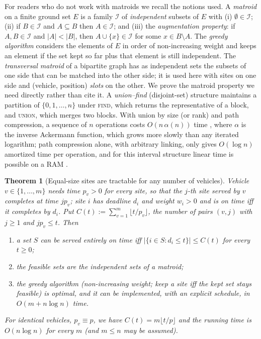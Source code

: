 \documentclass[pdflatex,sn-mathphys-ay]{sn-jnl}
\theoremstyle{thmstyleone}
\newtheorem{theorem}{Theorem}
\theoremstyle{thmstyletwo}
\theoremstyle{thmstylethree}
\begin{document}
For readers who do not work with matroids we recall the notions used.
A \emph{matroid} on a finite ground set $E$ is a family $\mathcal I$ of
\emph{independent} subsets of $E$ with (i) $\emptyset\in\mathcal I$;
(ii) if $B\in\mathcal I$ and $A\subseteq B$ then $A\in\mathcal I$; and
(iii) the \emph{augmentation property}: if $A,B\in\mathcal I$ and
$|A|<|B|$, then $A\cup\{x\}\in\mathcal I$ for some $x\in B\setminus A$.
The \emph{greedy algorithm} considers the elements of $E$ in order of
non-increasing weight and keeps an element if the set kept so far plus
that element is still independent. The \emph{transversal matroid} of a
bipartite graph has as independent sets the subsets of one side that can
be matched into the other side; it is used here with sites on one side
and (vehicle, position) \emph{slots} on the other. We prove the matroid
property we need directly rather than cite it. A \emph{union--find}
(disjoint-set) structure maintains a partition of $\{0,1,\dots,n\}$ under
\textsc{find}, which returns the representative of a block, and
\textsc{union}, which merges two blocks. With union by size (or rank) and
path compression, a sequence of $n$ operations costs $O(n\,\alpha(n))$
time \citep{kortevygen2018}, where $\alpha$ is the inverse Ackermann
function, which grows more slowly than any iterated logarithm; path
compression alone, with arbitrary linking, only gives $O(\log n)$
amortized time per operation, and for this interval structure linear time
is possible on a RAM \citep{gabow1985}.

\begin{theorem}[Equal-size sites are tractable for any number of vehicles]\label{thm:equalp}
Vehicle $v\in\{1,\dots,m\}$ needs time $p_v>0$ for every site, so that
the $j$-th site served by $v$ completes at time $jp_v$; site $i$ has
deadline $d_i$ and weight $w_i>0$ and is on time iff it completes by
$d_i$. Put $C(t):=\sum_{v=1}^m\lfloor t/p_v\rfloor$, the number of pairs
$(v,j)$ with $j\ge1$ and $jp_v\le t$. Then
\begin{enumerate}
\item[(a)] a set $S$ can be served entirely on time iff
$|\{i\in S:d_i\le t\}|\le C(t)$ for every $t\ge0$;
\item[(b)] the feasible sets are the independent sets of a matroid;
\item[(c)] the greedy algorithm (non-increasing weight; keep a site iff
the kept set stays feasible) is optimal, and it can be implemented, with
an explicit schedule, in $O(m+n\log n)$ time.
\end{enumerate}
For identical vehicles, $p_v\equiv p$, we have $C(t)=m\lfloor t/p\rfloor$
and the running time is $O(n\log n)$ for every $m$ (and $m\le n$ may be
assumed).
\end{theorem}
\end{document}
